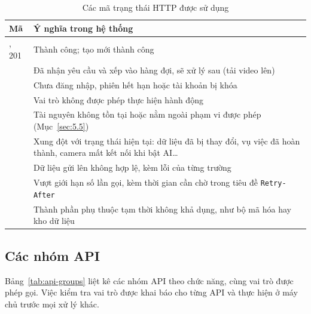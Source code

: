 \begin{table}[H]
\centering
\caption{Các mã trạng thái HTTP được sử dụng}
\label{tab:http-status}
\begin{tabularx}{\textwidth}{|>{\raggedright\arraybackslash}p{2.6cm}|L|}
\hline
\textbf{Mã} & \textbf{Ý nghĩa trong hệ thống} \\
, 201 & Thành công; tạo mới thành công \\
 & Đã nhận yêu cầu và xếp vào hàng đợi, sẽ xử lý sau (tải video lên) \\
 & Chưa đăng nhập, phiên hết hạn hoặc tài khoản bị khóa \\
 & Vai trò không được phép thực hiện hành động \\
 & Tài nguyên không tồn tại hoặc nằm ngoài phạm vi được phép (Mục~\ref{sec:5.5}) \\
 & Xung đột với trạng thái hiện tại: dữ liệu đã bị thay đổi, vụ việc đã hoàn thành, camera mất kết nối khi bật AI\ldots \\
 & Dữ liệu gửi lên không hợp lệ, kèm lỗi của từng trường \\
 & Vượt giới hạn số lần gọi, kèm thời gian cần chờ trong tiêu đề \texttt{Retry-After} \\
 & Thành phần phụ thuộc tạm thời không khả dụng, như bộ mã hóa hay kho dữ liệu \\
\hline
\end{tabularx}
\end{table}

\subsection{Các nhóm API}
\label{sec:5.4.2}

Bảng~\ref{tab:api-groups} liệt kê các nhóm API theo chức năng, cùng vai trò được phép gọi. Việc kiểm tra vai trò được khai báo cho từng API và thực hiện ở máy chủ trước mọi xử lý khác.

